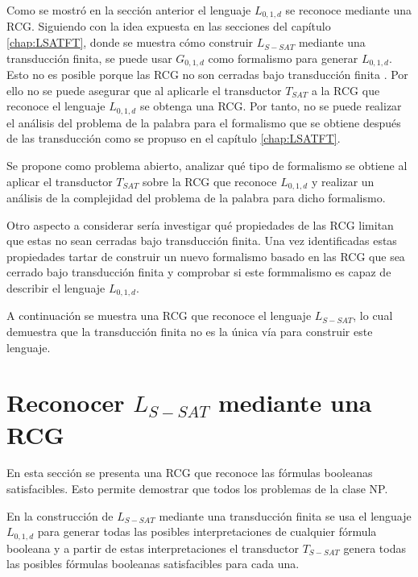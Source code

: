 \documentclass[12pt]{article}
\begin{document}
Como se mostró en la sección anterior el lenguaje $L_{0,1,d}$ se reconoce mediante una RCG.  Siguiendo con la idea 
expuesta en las secciones del capítulo \ref{chap:LSATFT}, donde se muestra cómo construir $L_{S-SAT}$ mediante 
una transducción finita, se puede usar $G_{0,1,d}$ como formalismo para generar $L_{0,1,d}$.  Esto no es posible 
porque las RCG no son cerradas bajo transducción finita .  Por ello no se puede asegurar que al aplicarle el transductor $T_{SAT}$ a la RCG que reconoce el lenguaje $L_{0,1,d}$ se obtenga una RCG. Por tanto, no se puede realizar el análisis del problema de la palabra para el formalismo que se obtiene después de las transducción como se propuso en el capítulo \ref{chap:LSATFT}.

Se propone como problema abierto, analizar qué tipo de formalismo se obtiene al aplicar el transductor $T_{SAT}$ sobre la RCG que reconoce $L_{0,1,d}$ y realizar un análisis de la complejidad del problema de la palabra para dicho formalismo.

Otro aspecto a considerar sería investigar qué propiedades de las RCG limitan que estas no sean cerradas bajo transducción finita.
Una vez identificadas estas propiedades tartar de construir un nuevo formalismo basado en las RCG que sea cerrado bajo transducción finita
y comprobar si este formmalismo es capaz de describir el lenguaje $L_{0,1,d}$.

A continuación se muestra una RCG que reconoce el lenguaje $L_{S-SAT}$, lo cual demuestra que la transducción
finita no es la única vía para construir este lenguaje.

\section{Reconocer $L_{S-SAT}$ mediante una RCG}

En esta sección se presenta una RCG que reconoce las fórmulas booleanas satisfacibles. Esto permite demostrar que  todos los problemas de la clase NP.

En la construcción de $L_{S-SAT}$ mediante una transducción finita se usa el lenguaje $L_{0,1,d}$ para generar todas las posibles interpretaciones de cualquier fórmula booleana y a partir de estas interpretaciones el transductor $T_{S-SAT}$ genera todas las posibles fórmulas booleanas satisfacibles para cada una. 
\end{document}
